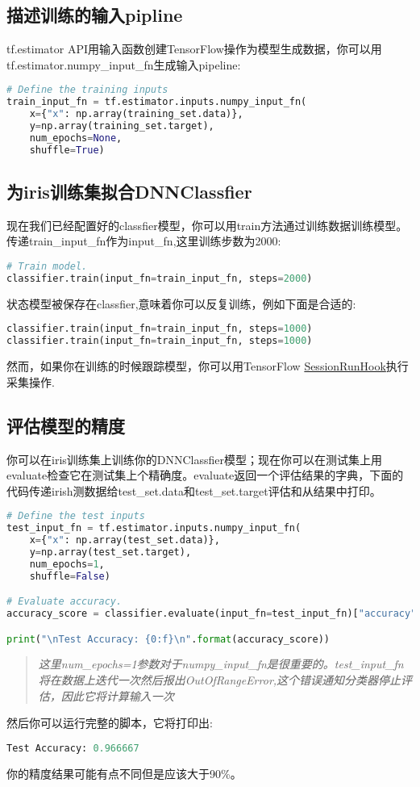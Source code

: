\subsection{描述训练的输入pipline}
tf.estimator API用输入函数创建TensorFlow操作为模型生成数据，你可以用\newline
tf.estimator.numpy\_input\_fn生成输入pipeline:
\begin{lstlisting}[language=Python]
# Define the training inputs
train_input_fn = tf.estimator.inputs.numpy_input_fn(
    x={"x": np.array(training_set.data)},
    y=np.array(training_set.target),
    num_epochs=None,
    shuffle=True)
\end{lstlisting}
\subsection{为iris训练集拟合DNNClassfier}
现在我们已经配置好的classfier模型，你可以用train方法通过训练数据训练模型。传递train\_input\_fn作为input\_fn,这里训练步数为2000:
\begin{lstlisting}[language=Python]
# Train model.
classifier.train(input_fn=train_input_fn, steps=2000)
\end{lstlisting}
状态模型被保存在classfier,意味着你可以反复训练，例如下面是合适的:
\begin{lstlisting}[language=Python]
classifier.train(input_fn=train_input_fn, steps=1000)
classifier.train(input_fn=train_input_fn, steps=1000)
\end{lstlisting}
然而，如果你在训练的时候跟踪模型，你可以用TensorFlow \href{https://www.tensorflow.org/api_docs/python/tf/train/SessionRunHook}{SessionRunHook}执行采集操作.
\subsection{评估模型的精度}
你可以在iris训练集上训练你的DNNClassfier模型；现在你可以在测试集上用evaluate检查它在测试集上个精确度。evaluate返回一个评估结果的字典，下面的代码传递irish测数据给test\_set.data和test\_set.target评估和从结果中打印。
\begin{lstlisting}[language=Python]
# Define the test inputs
test_input_fn = tf.estimator.inputs.numpy_input_fn(
    x={"x": np.array(test_set.data)},
    y=np.array(test_set.target),
    num_epochs=1,
    shuffle=False)

# Evaluate accuracy.
accuracy_score = classifier.evaluate(input_fn=test_input_fn)["accuracy"]

print("\nTest Accuracy: {0:f}\n".format(accuracy_score))
\end{lstlisting}
\begin{quote}
\emph{这里num\_epochs=1参数对于numpy\_input\_fn是很重要的。test\_input\_fn将在数据上迭代一次然后报出OutOfRangeError,这个错误通知分类器停止评估，因此它将计算输入一次}
\end{quote}
然后你可以运行完整的脚本，它将打印出:
\begin{lstlisting}[language=Python]
Test Accuracy: 0.966667
\end{lstlisting}
你的精度结果可能有点不同但是应该大于90\%。

